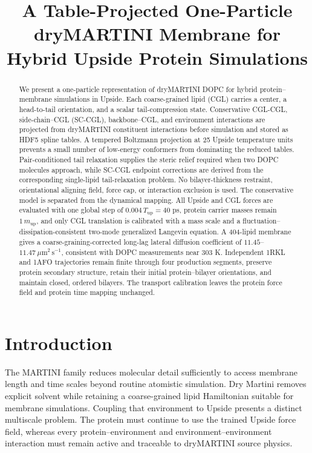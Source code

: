\documentclass{article}
\begin{document}
\title{A Table-Projected One-Particle dryMARTINI Membrane for Hybrid Upside Protein Simulations}
\author{}
\date{}
\maketitle

\begin{abstract}
We present a one-particle representation of dryMARTINI DOPC for hybrid
protein--membrane simulations in Upside.  Each coarse-grained lipid (CGL)
carries a center, a head-to-tail orientation, and a scalar tail-compression
state.  Conservative CGL-CGL, side-chain--CGL (SC-CGL), backbone--CGL, and
environment interactions are projected from dryMARTINI constituent
interactions before simulation and stored as HDF5 spline tables.  A tempered
Boltzmann projection at 25 Upside temperature units prevents a small number of
low-energy conformers from dominating the reduced tables.  Pair-conditioned
tail relaxation supplies the steric relief required when two DOPC molecules
approach, while SC-CGL endpoint corrections are derived from the corresponding
single-lipid tail-relaxation problem.  No bilayer-thickness restraint,
orientational aligning field, force cap, or interaction exclusion is used.
The conservative model is separated from the dynamical mapping.  All Upside
and CGL forces are evaluated with one global step of
$0.004\,T_{\mathrm{up}}=40$ ps, protein carrier masses remain
$1\,m_{\mathrm{up}}$, and only CGL translation is calibrated with a mass
scale and a fluctuation--dissipation-consistent two-mode generalized Langevin
equation.  A 404-lipid membrane gives a coarse-graining-corrected long-lag
lateral diffusion coefficient of $11.45$--$11.47~\mu\mathrm{m}^2\,\mathrm{s}^{-1}$,
consistent with DOPC measurements near 303 K.  Independent 1RKL and 1AFO
trajectories remain finite through four production segments, preserve protein
secondary structure, retain their initial protein--bilayer orientations, and
maintain closed, ordered bilayers.  The transport calibration leaves the
protein force field and protein time mapping unchanged.
\end{abstract}

\section{Introduction}

The MARTINI family reduces molecular detail sufficiently to access membrane
length and time scales beyond routine atomistic simulation.
\cite{marrink2007}  Dry Martini removes explicit solvent while retaining a
coarse-grained lipid Hamiltonian suitable for membrane simulations.
\cite{arnarez2015}  Coupling that environment to Upside presents a distinct
multiscale problem.  The protein must continue to use the trained Upside force
field, whereas every protein--environment and environment--environment
interaction must remain active and traceable to dryMARTINI source physics.
\end{document}
